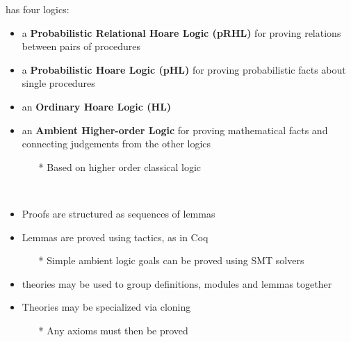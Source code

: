 
\begin{note}[Logics]
\EasyCrypt has four logics:

\begin{itemize}
	\item a \textbf{Probabilistic Relational Hoare Logic (pRHL)} for proving relations between pairs of procedures
	\item a \textbf{Probabilistic Hoare Logic (pHL)} for proving probabilistic facts about single procedures
	\item an \textbf{Ordinary Hoare Logic (HL)}
	\item an \textbf{Ambient Higher-order Logic} for proving mathematical facts and connecting judgements from the other logics
	\begin{itemize}
		\item[*] Based on higher order classical logic
	\end{itemize}
\end{itemize}
\end{note}

\begin{note}
\ \begin{itemize}
	\item Proofs are structured as sequences of lemmas
	\item Lemmas are proved using tactics, as in Coq
	\begin{itemize}
		\item[*] Simple ambient logic goals can be proved using SMT solvers 
	\end{itemize}
	\item \EasyCrypt theories may be used to group definitions, modules and lemmas together
	\item Theories may be specialized via cloning
	\begin{itemize}
		\item[*] Any axioms must then be proved
	\end{itemize}
\end{itemize}
\end{note}

\newpage

